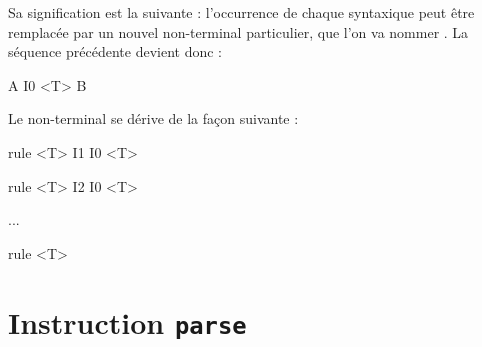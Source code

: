Sa signification est la suivante : l'occurrence de chaque  syntaxique peut être remplacée par un nouvel non-terminal particulier, que l'on va nommer . La séquence précédente devient donc :
\begin{galgascode}
A
I0
<T>
B
\end{galgascode}

Le non-terminal  se dérive de la façon suivante :
\begin{galgascode}
rule <T> { I1 I0 <T> }

rule <T> { I2 I0 <T> }

...

rule <T> {  }
\end{galgascode}







\section{Instruction \texttt{parse}}











